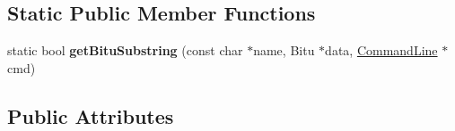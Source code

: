 \subsection*{Static Public Member Functions}
\begin{DoxyCompactItemize}
\item 
\hypertarget{classCSerial_afe886d83864c7326400d2830555c8c2e}{static bool {\bfseries get\-Bitu\-Substring} (const char $\ast$name, Bitu $\ast$data, \hyperlink{classCommandLine}{Command\-Line} $\ast$cmd)}\label{classCSerial_afe886d83864c7326400d2830555c8c2e}

\end{DoxyCompactItemize}
\subsection*{Public Attributes}
